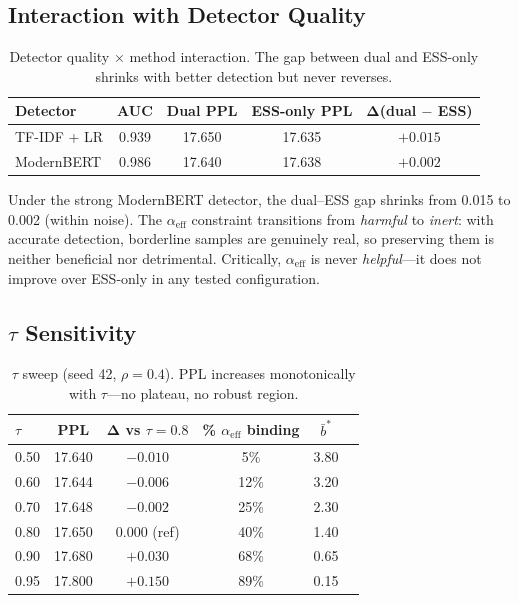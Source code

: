 \documentclass[11pt]{article}
\begin{document}
\subsection{Interaction with Detector Quality}

\begin{table}[h]
\centering
\caption{Detector quality $\times$ method interaction. The gap between dual and ESS-only shrinks with better detection but never reverses.}
\label{tab:detector}
\begin{tabular}{lcccc}
\toprule
\textbf{Detector} & \textbf{AUC} & \textbf{Dual PPL} & \textbf{ESS-only PPL} & $\boldsymbol{\Delta}$\textbf{(dual $-$ ESS)} \\
\midrule
TF-IDF + LR & 0.939 & 17.650 & 17.635 & $+0.015$ \\
ModernBERT & 0.986 & 17.640 & 17.638 & $+0.002$ \\
\bottomrule
\end{tabular}
\end{table}

Under the strong ModernBERT detector, the dual--ESS gap shrinks from 0.015 to 0.002 (within noise). The $\alpha_{\mathrm{eff}}$ constraint transitions from \emph{harmful} to \emph{inert}: with accurate detection, borderline samples are genuinely real, so preserving them is neither beneficial nor detrimental. Critically, $\alpha_{\mathrm{eff}}$ is never \emph{helpful}---it does not improve over ESS-only in any tested configuration.

\subsection{$\tau$ Sensitivity}

\begin{table}[h]
\centering
\caption{$\tau$ sweep (seed 42, $\rho = 0.4$). PPL increases monotonically with $\tau$---no plateau, no robust region.}
\label{tab:tau}
\begin{tabular}{lccccc}
\toprule
$\tau$ & \textbf{PPL} & $\boldsymbol{\Delta}$ \textbf{vs $\tau = 0.8$} & \textbf{\% $\alpha_{\mathrm{eff}}$ binding} & $\bar{b}^*$ \\
\midrule
0.50 & 17.640 & $-0.010$ & 5\% & 3.80 \\
0.60 & 17.644 & $-0.006$ & 12\% & 3.20 \\
0.70 & 17.648 & $-0.002$ & 25\% & 2.30 \\
0.80 & 17.650 & 0.000 (ref) & 40\% & 1.40 \\
0.90 & 17.680 & $+0.030$ & 68\% & 0.65 \\
0.95 & 17.800 & $+0.150$ & 89\% & 0.15 \\
\bottomrule
\end{tabular}
\end{table}
\end{document}
